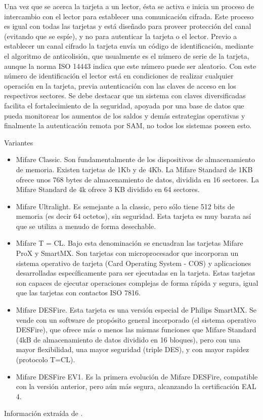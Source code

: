 Una vez que se acerca la tarjeta a un lector, ésta se activa e inicia un proceso de intercambio con el lector para establecer una comunicación cifrada. Este proceso es igual con todas las tarjetas y está diseñado para proveer protección del canal (evitando que se espíe), y no para autenticar la tarjeta o el lector.
Previo a establecer un canal cifrado la tarjeta envía un código de identificación, mediante el algoritmo de anticolisión, que usualmente es el número de serie de la tarjeta, aunque la norma ISO 14443 indica que este número puede ser aleatorio. Con este número de identificación el lector está en condiciones de realizar cualquier operación en la tarjeta, previa autenticación con las claves de acceso en los respectivos sectores.
Se debe destacar que un sistema con claves diversificadas facilita el fortalecimiento de la seguridad, apoyada por una base de datos que pueda monitorear los aumentos de los saldos y demás estrategias operativas y finalmente la autenticación remota por SAM, no todos los sistemas poseen esto.

\bigskip
Variantes

\begin{itemize}
\item Mifare Classic. Son fundamentalmente de los dispositivos de almacenamiento de memoria. Existen tarjetas de 1Kb y de 4Kb. La Mifare Standard de 1KB ofrece unos 768 bytes de almacenamiento de datos, dividida en 16 sectores. La Mifare Standard de 4k ofrece 3 KB dividido en 64 sectores. 
\item Mifare Ultralight. Es semejante a la classic, pero sólo tiene 512 bits de memoria (es decir 64 octetos), sin seguridad. Esta tarjeta es muy barata así que se utiliza a menudo de forma desechable. 
\item Mifare T = CL. Bajo esta denominación se encuadran las tarjetas Mifare ProX y SmartMX. Son tarjetas con microprocesador que incorporan un sistema operativo de tarjeta (Card Operating System - COS) y aplicaciones desarrolladas específicamente para ser ejecutadas en la tarjeta. Estas tarjetas son capaces de ejecutar operaciones complejas de forma rápida y segura, igual que las tarjetas con contactos ISO 7816. 
\item Mifare DESFire. Esta tarjeta es una versión especial de Philips SmartMX. Se vende con un software de propósito general incorporado (el sistema operativo DESFire), que ofrece más o menos las mismas funciones que Mifare Standard (4kB de almacenamiento de datos dividido en 16 bloques), pero con una mayor flexibilidad, una mayor seguridad (triple DES), y con mayor rapidez (protocolo T=CL). 
\item Mifare DESFire EV1. Es la primera evolución de Mifare DESFire, compatible con la versión anterior, pero aún más segura, alcanzando la certificación EAL 4.
\end{itemize}

\bigskip
Información extraída de \cite{Attack} \cite{Wikisc}.